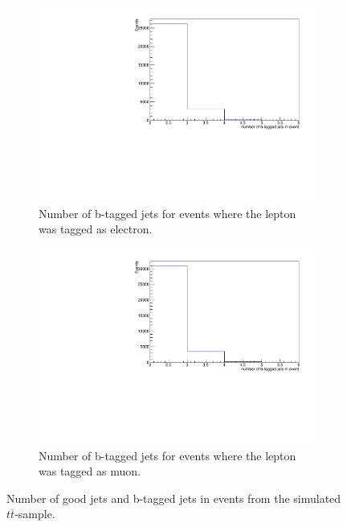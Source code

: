 \begin{figure}[H]
  \begin{subfigure}{0.48\textwidth}%
    \centering%
    \includegraphics[width=\textwidth]{plots/ttbar_distributions/ttbar.el_jet_btag.pdf}%
    \caption{Number of b-tagged jets for events where the lepton was tagged as electron.}%
    \label{fig:3c}%
  \end{subfigure}%
  \hfill
  \begin{subfigure}{0.48\textwidth}%
    \centering%
    \includegraphics[width=\textwidth]{plots/ttbar_distributions/ttbar.mu_jet_btag.pdf}%
    \caption{Number of b-tagged jets for events where the lepton was tagged as muon.}%
    \label{fig:3d}%
  \end{subfigure}%
  \caption{Number of good jets and b-tagged jets in events from the simulated $t \overline{t}$-sample.}%
  \label{fig:3}%
\end{figure}

